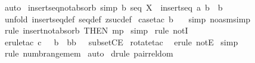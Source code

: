 \begin{isabellebody}
%
\isatagproof
{}\isamarkupfalse%
\ auto\isanewline
{}\isamarkupfalse%
%
\endisatagproof
{\isafoldproof}%
%
\isadelimproof
\isanewline
%
\endisadelimproof
\isanewline
\isanewline
{}\isamarkupfalse%
\ insertseq{\isacharunderscore}not{\isacharunderscore}absorb\ {\isacharbrackleft}simp{\isacharbrackright}{\isacharcolon}\ {\isachardoublequoteopen}b{\isacharcolon}\ seq\ X\ {\isacharequal}{\isacharequal}{\isachargreater}\ insertseq\ a\ b\ {\isachartilde}{\isacharequal}\ b{\isachardoublequoteclose}\isanewline
%
\isadelimproof
%
\endisadelimproof
%
\isatagproof
{}\isamarkupfalse%
\ {\isacharparenleft}unfold\ insertseq{\isacharunderscore}def\ seq{\isacharunderscore}def\ zsuc{\isacharunderscore}def{\isacharparenright}\isanewline
{}\isamarkupfalse%
\ {\isacharparenleft}case{\isacharunderscore}tac\ {\isachardoublequoteopen}b\ {\isacharequal}\ {\isacharbraceleft}{\isacharbraceright}{\isachardoublequoteclose}{\isacharparenright}\isanewline
{}\isamarkupfalse%
\ {\isacharparenleft}simp\ {\isacharparenleft}no{\isacharunderscore}asm{\isacharunderscore}simp{\isacharparenright}{\isacharparenright}\isanewline
{}\isamarkupfalse%
\ {\isacharparenleft}rule\ insert{\isacharunderscore}not{\isacharunderscore}absorb{}\ {\isacharbrackleft}THEN\ mp{\isacharbrackright}{\isacharparenright}\isanewline
{}\isamarkupfalse%
\ simp\isanewline
\isanewline
{}\isamarkupfalse%
\ {\isacharparenleft}rule\ notI{\isacharparenright}\isanewline
{}\isamarkupfalse%
\ {\isacharparenleft}erule{\isacharunderscore}tac\ c\ {\isacharequal}\ {\isachardoublequoteopen}\ {\isacharparenleft}{\isacharhash}b\ {\isacharplus}\ {}{\isacharcomma}b{\isacharpercent}{\isacharcircum}{\isacharhash}b{\isacharparenright}\ {\isachardoublequoteclose}\ \ subsetCE{\isacharparenright}\isanewline
{}\isamarkupfalse%
\ {\isacharparenleft}rotate{\isacharunderscore}tac\ {\isacharminus}{}{\isacharparenright}\isanewline
{}\isamarkupfalse%
\ {\isacharparenleft}erule\ notE{\isacharparenright}\isanewline
{}\isamarkupfalse%
\ simp\isanewline
\isanewline
{}\isamarkupfalse%
\ {\isacharparenleft}rule\ numb{\isacharunderscore}range{\isacharunderscore}mem{\isacharparenright}\isanewline
{}\isamarkupfalse%
\ auto\isanewline
{}\isamarkupfalse%
\ {\isacharparenleft}drule\ pair{\isacharunderscore}rel{\isacharunderscore}dom{\isacharparenright}\isanewline

\end{isabellebody}
